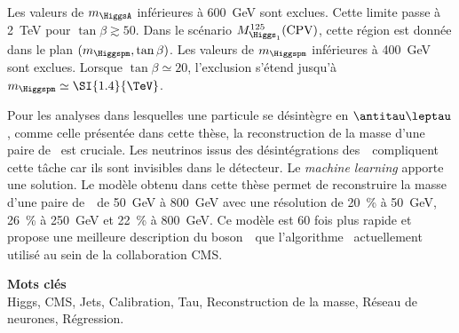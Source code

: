 Les valeurs de $m_{\HiggsA}$ inférieures à \SI{600}{\GeV} sont exclues.
Cette limite passe à
\SI{2}{\TeV} pour $\tan\beta\gtrsim\num{50}$.
Dans le scénario $M_{\Higgs_1}^{125}(\text{CPV})$,
cette région est donnée dans le plan $(m_{\Higgspm},\tan\beta)$.
Les valeurs de $m_{\Higgspm}$ inférieures à \SI{400}{\GeV} sont exclues.
Lorsque
$\tan\beta\simeq\num{20}$,
l'exclusion s'étend jusqu'à
$m_{\Higgspm} \simeq \SI{1.4}{\TeV}$.
\par
Pour les analyses dans lesquelles une particule se désintègre en $\antitau\leptau$,
comme celle présentée dans cette thèse,
la reconstruction de la masse d'une paire de \tau\
est cruciale.
Les neutrinos issus des désintégrations des~\tau\ compliquent cette tâche car ils sont invisibles dans le détecteur.
Le \emph{machine learning} apporte une solution.
Le modèle obtenu dans cette thèse permet
de reconstruire la masse d'une paire de~\tau\
de \SI{50}{\GeV} à \SI{800}{\GeV}
avec une résolution de
\SI{20}{\%} à \SI{50}{\GeV},
\SI{26}{\%} à \SI{250}{\GeV} et
\SI{22}{\%} à \SI{800}{\GeV}.
Ce modèle est
60 fois plus rapide
et propose une meilleure description du boson~\Zboson\
que l'algorithme \SVFIT\ actuellement utilisé au sein de la collaboration CMS.

\vfill

\noindent\textbf{\Large\sffamily Mots clés}\\
Higgs,
CMS,
Jets,
Calibration,
Tau,
Reconstruction de la masse,
Réseau de neurones,
Régression.

\vspace{2\baselineskip}